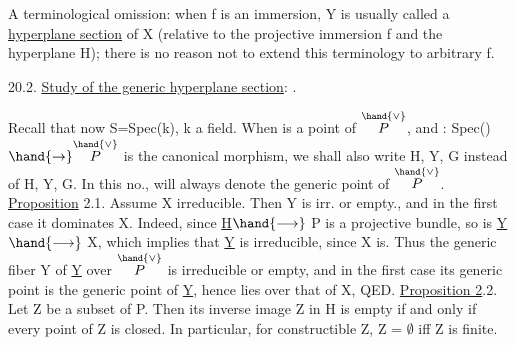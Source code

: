 
A terminological omission: when f is an immersion, Y\hand{$_\xi$} is usually
called a \uline{hyperplane section} of X (relative to the projective immersion
f and the hyperplane H); there is no reason not to extend this
terminology to arbitrary f.

20.2. \uline{Study of the generic hyperplane section}: .

Recall that now S=Spec(k), k a field. When \hand{$\eta$} is a point
of $\overset{\hand{\vee}}{P}$,  and \hand{$\xi$}: Spec(\hand{$\eta$})$\hand{\to}\overset{\hand{\vee}}{P}$ is the canonical morphism, we shall also write
H\hand{$_\eta$}, Y\hand{$_\eta$}, G\hand{$_\eta$} instead of H\hand{$_\xi$}, Y\hand{$_\xi$}, G\hand{$_\xi$}. In this no., \hand{$\eta$}
will always denote the generic point of $\overset{\hand{\vee}}{P}$.
\uline{Proposition} 2.1. Assume X irreducible. Then Y\hand{$_\eta$} is irr.  or empty.,
and in the first case it dominates X. 
Indeed, since \uline{H}$\hand{\longrightarrow}$ P is a projective bundle, so is
\uline{Y}$\hand{\longrightarrow}$ X, which implies that \uline{Y} is irreducible, since X is. Thus the generic
fiber Y of \uline{Y} over $\overset{\hand{\vee}}{P}$ is irreducible or empty, and in the first case
its generic point is the generic point of \uline{Y}, hence lies over that of
X, QED.
\uline{Proposition 2}.2. Let Z be a subset of P. Then its inverse image Z\hand{$_\eta$} in
H\hand{$_\eta$} is empty if and only if every point of Z is closed. In particular,
for constructible Z, Z\hand{$_\eta$} = $\emptyset$ iff Z is finite.

